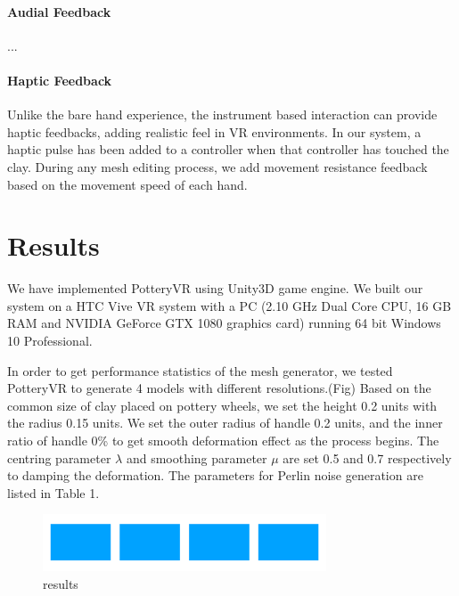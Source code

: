 \paragraph{Audial Feedback}
...



\paragraph{Haptic Feedback}
Unlike the bare hand experience, the instrument based interaction can provide haptic feedbacks, adding realistic feel in VR environments. In our system, a haptic pulse has been added to a controller when that controller has touched the clay. During any mesh editing process, we add movement resistance feedback based on the movement speed of each hand.

\section{Results}
\label{sec:5}
We have implemented PotteryVR using Unity3D\cite{website:unity} game engine. We built our system on a HTC Vive\cite{website:vive} VR system with a PC (2.10 GHz Dual Core CPU, 16 GB RAM and NVIDIA GeForce GTX 1080 graphics card) running 64 bit Windows 10 Professional.

In order to get performance statistics of the mesh generator, we tested PotteryVR to generate 4 models with different resolutions.(Fig) 
Based on the common size of clay placed on pottery wheels, we set the height 0.2 units with the radius 0.15 units.
We set the outer radius of handle 0.2 units, and the inner ratio of handle 0\% to get smooth deformation effect as the process begins. The centring parameter $\lambda$ and smoothing parameter $\mu$ are set 0.5 and 0.7 respectively to damping the deformation. The parameters for Perlin noise generation are listed in Table 1.

\begin{figure}
  \includegraphics[width=0.75\textwidth]{t2.pdf}
\caption{results}
\label{fig:1}       %
\end{figure}

